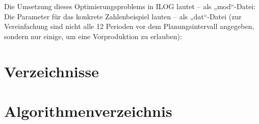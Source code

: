 		Die Umsetzung dieses Optimierungsproblems in ILOG lautet -- als „mod“-Datei:\\
		


		Die Parameter für das konkrete Zahlenbeispiel lauten -- als „dat“-Datei (zur Vereinfachung sind nicht alle 12 Perioden vor dem Planungsintervall angegeben, sondern nur einige, um eine Vorproduktion zu erlauben):\\ 
		 

		\pagebreak

		 \label{Verzeichnisse}
		\renewcommand{\thesection}{\Roman{verzeichnis}}
		\section*{Verzeichnisse}
   		 \label{Literaturverzeichnis}
		\renewcommand{\refname}{Literaturverzeichnis}
		\printbibliography
		\pagebreak

		\listoffigures
		\pagebreak


		\listoftables
		\pagebreak

        \lstlistoflistings
        \pagebreak


        \section{Algorithmenverzeichnis}
        \vspace{-2em}



